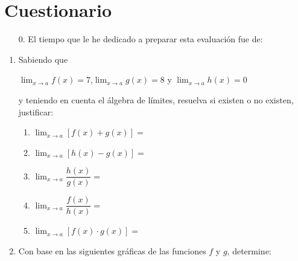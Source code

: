 \documentclass[letterpaper,fleqn]{article}
\let\ds\displaystyle
\begin{document}
 \section*{Cuestionario}
 \begin{enumerate}
 \item[0.] El tiempo que le he dedicado a preparar esta evaluación fue de: \hrulefill 
 \end{enumerate}
\begin{enumerate}
 \item Sabiendo que
\begin{center}
$\ds{\lim_{x\rightarrow a}f(x)=7}$,\quad  $\ds{\lim_{x\rightarrow a}g(x)=8}$ \quad y \quad $\ds{\lim_{x\rightarrow a}h(x)=0}$ 
\end{center}
y teniendo en cuenta el álgebra de límites, resuelva si existen o no existen, justificar:
      \begin{enumerate}
	 \item $\ds{\lim_{x\rightarrow a}[f(x)+g(x)]}=$
	 \item $\ds{\lim_{x\rightarrow a}[h(x)-g(x)]}=$
	 \item $\ds{\lim_{x\rightarrow a}\dfrac{h(x)}{g(x)}}=$
	 \item $\ds{\lim_{x\rightarrow a}\dfrac{f(x)}{h(x)}}=$
	 \item $\ds{\lim_{x\rightarrow a}[f(x)\cdot g(x)]}=$
      \end{enumerate}
   \item Con base en las siguientes gráficas de las funciones $f$ y $g$, determine:


\end{enumerate}
\end{document}
